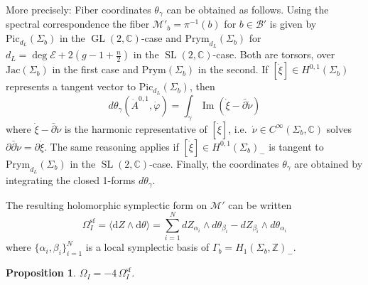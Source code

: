 \documentclass[12pt,letterpaper,reqno]{amsart}
\newtheorem{prop}[thm]{Proposition}
\theoremstyle{remark}
\theoremstyle{definition}
\numberwithin{thm}{section}
\numberwithin{equation}{section}
\numberwithin{figure}{section}
\newcommand{\cB}{\ensuremath{\mathcal B}}
\newcommand{\cM}{\ensuremath{\mathcal M}}
\newcommand{\C}{\ensuremath{\mathbb C}}
\newcommand{\Z}{\ensuremath{\mathbb Z}}
\newcommand{\cE}{{\mathcal E}}
\newcommand{\semif}{\ensuremath{\mathrm{sf}}}
\newcommand{\de}{\mathrm{d}}
\DeclareMathOperator{\im}{Im}
\DeclareMathOperator{\GL}{GL}
\DeclareMathOperator{\SL}{SL}
\begin{document}
 More precisely: Fiber coordinates $\theta_\gamma$ can be obtained as follows. Using the spectral correspondence the fiber $\cM'_b = \pi^{-1}(b)$ for $b \in \cB'$ is given by $\mathrm{Pic}_{d_L}(\Sigma_b)$ in the $\GL(2,\C)$-case and $\mathrm{Prym}_{d_L}(\Sigma_b)$ for $d_L=\deg \cE + 2(g-1+ \frac{n}{2})$ in the $\SL(2,\C)$-case. Both are torsors, over $\mathrm{Jac}(\Sigma_b)$ in the first case and $\mathrm{Prym}(\Sigma_b)$ in the second. If $[\dot \xi] \in H^{0,1}(\Sigma_b)$ represents a tangent vector to $\mathrm{Pic}_{d_L}(\Sigma_b)$, then
\[
 d \theta_\gamma ( \dot{A}^{0,1}, \dot \varphi) = \int_\gamma \im (\dot \xi - \bar\partial \dot \nu)
 \]
 where $\dot \xi - \bar\partial \dot \nu$ is the harmonic representative of $[\dot \xi]$, i.e.\ $\dot \nu \in C^\infty(\Sigma_b,\C)$ solves $\partial\bar\partial \dot \nu = \partial\dot \xi$. The same reasoning applies if $[\dot \xi] \in H^{0,1}(\Sigma_b)_-$ is tangent to $\mathrm{Prym}_{d_L}(\Sigma_b)$ in the $\SL(2,\C)$-case. Finally, the coordinates $\theta_\gamma$ are obtained by integrating the closed 1-forms $d \theta_\gamma$. 
 \medskip
 
 The resulting holomorphic symplectic form on $\cM'$ can be written 
 \[
 \Omega_I^{\semif}= \langle \de Z \wedge \de \theta \rangle = \sum_{i=1}^N d Z_{\alpha_i}\wedge d \theta _{\beta_i} - d Z_{\beta_i}\wedge d \theta_{\alpha_i}
 \]
where $\{\alpha_i, \beta_i\}_{i=1}^N$ is a local symplectic basis of  $\Gamma_b = H_1(\Sigma_b, \Z)_-$.
\begin{prop}\label{prop:semiflatsymplectic} 
$\Omega_I = -4 \,\Omega_I^{\semif}$. 
\end{prop}
\end{document}
